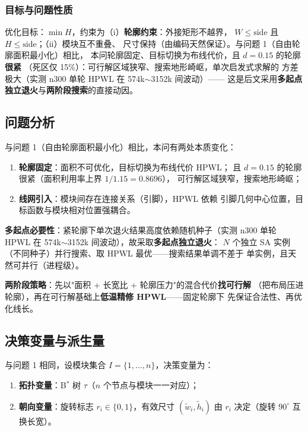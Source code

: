 \documentclass[12pt,a4paper]{article}
\begin{document}
\subsubsection*{目标与问题性质}

优化目标：$\min H$，约束为（i）\textbf{轮廓约束}：外接矩形不越界，
$W \le \text{side}$ 且 $H \le \text{side}$；（ii）模块互不重叠、
尺寸保持（由编码天然保证）。与问题 1（自由轮廓面积最小化）相比，
本问轮廓固定、目标切换为布线代价，且 $d = 0.15$ 的轮廓\textbf{很紧}
（死区仅 15\%）：可行解区域狭窄、搜索地形崎岖，单次启发式求解的
方差极大（实测 n300 单轮 HPWL 在 574k$\sim$3152k 间波动）——
这是后文采用\textbf{多起点独立退火}与\textbf{两阶段搜索}的直接动因。

\subsection{问题分析}

与问题 1（自由轮廓面积最小化）相比，本问有两处本质变化：

\begin{enumerate}
    \item \textbf{轮廓固定}：面积不可优化，目标切换为布线代价 HPWL；
    且 $d = 0.15$ 的轮廓很紧（面积利用率上界 $1/1.15 = 0.8696$），
    可行解区域狭窄，搜索地形崎岖；
    \item \textbf{线网引入}：模块间存在连接关系（引脚），HPWL 依赖
    引脚几何中心位置，目标函数与模块相对位置强耦合。
\end{enumerate}

\textbf{多起点必要性}：紧轮廓下单次退火结果高度依赖随机种子（实测 n300
单轮 HPWL 在 574k$\sim$3152k 间波动），故采取\textbf{多起点独立退火}：
$N$ 个独立 SA 实例（不同种子）并行搜索、取 HPWL 最优——搜索结果单调不差于
单实例，且天然可并行（进程级）。

\textbf{两阶段策略}：先以"面积 + 长宽比 + 轮廓压力"的混合代价\textbf{找可行解}
（把布局压进轮廓），再在可行解基础上\textbf{低温精修 HPWL}——固定轮廓下
先保证合法性、再优化线长。

\subsection{决策变量与派生量}

与问题 1 相同，设模块集合 $I = \{1, \dots, n\}$，决策变量为：
\begin{enumerate}
    \item \textbf{拓扑变量}：B$^*$ 树 $\tau$（$n$ 个节点与模块一一对应）；
    \item \textbf{朝向变量}：旋转标志 $r_i \in \{0,1\}$，有效尺寸
    $(\tilde w_i, \tilde h_i)$ 由 $r_i$ 决定（旋转 $90^\circ$ 互换长宽）。
\end{enumerate}
\end{document}
